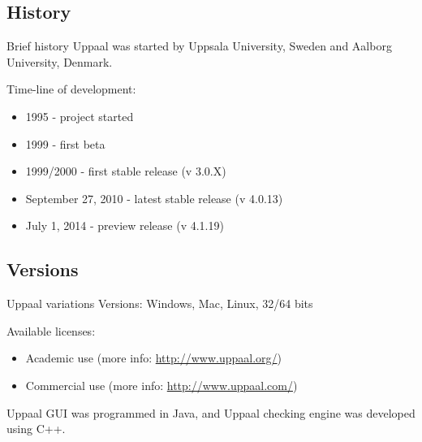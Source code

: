 \documentclass{beamer}
\begin{document}
\subsection{History}
\begin{frame}{Brief history}
	Uppaal was started by Uppsala University, Sweden and Aalborg University, Denmark.
	
	Time-line of development:
	\begin{itemize}
		\item 1995 - project started
		\item 1999 - first beta
		\item 1999/2000 - first stable release (v 3.0.X)
		\item September 27, 2010 - latest stable release (v 4.0.13)
		\item July 1, 2014 - preview release (v 4.1.19)
	\end{itemize}
	
\end{frame}

\subsection{Versions}
\begin{frame}{Uppaal variations}
	Versions: Windows, Mac, Linux, 32/64 bits
	
	Available licenses:
	\begin{itemize}
		\item Academic use (more info: \href{http://www.uppaal.org/}{http://www.uppaal.org/})
		\item Commercial use (more info: \href{http://www.uppaal.com/}{http://www.uppaal.com/})
	\end{itemize}
	
	Uppaal GUI was programmed in Java, and Uppaal checking engine was developed using C++.
\end{frame}
\end{document}
